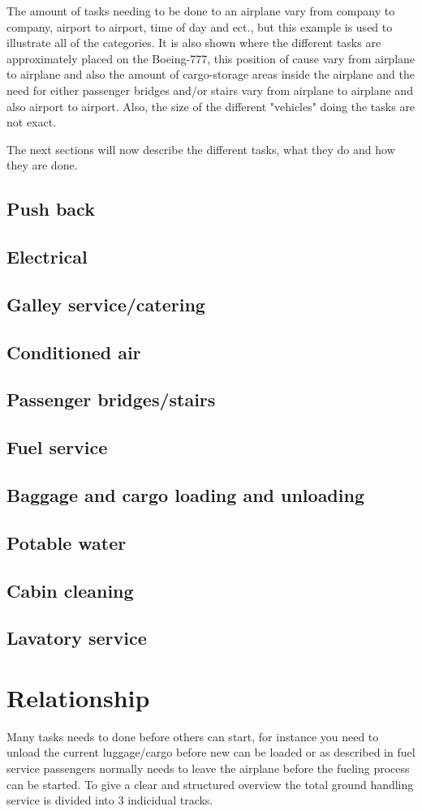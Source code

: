 The amount of tasks needing to be done to an airplane vary from company to company, airport to airport, time of day and ect., but this example is used to illustrate all of the categories. It is also shown where the different tasks are approximately placed on the Boeing-777, this position of cause vary from airplane to airplane and also the amount of cargo-storage areas inside the airplane and the need for either passenger bridges and/or stairs vary from airplane to airplane and also airport to airport. Also, the size of the different "vehicles" doing the tasks are not exact.

The next sections will now describe the different tasks, what they do and how they are done.

\subsection{Push back}
\subsection{Electrical}
\subsection{Galley service/catering}
\subsection{Conditioned air}
\subsection{Passenger bridges/stairs}
\subsection{Fuel service}

\subsection{Baggage and cargo loading and unloading}
\subsection{Potable water}
\subsection{Cabin cleaning}
\subsection{Lavatory service}

\section{Relationship}
Many tasks needs to done before others can start, for instance you need to unload the current luggage/cargo before new can be loaded or as described in fuel service passengers normally needs to leave the airplane before the fueling process can be started. To give a clear and structured overview the total ground handling service is divided into 3 indicidual tracks. 